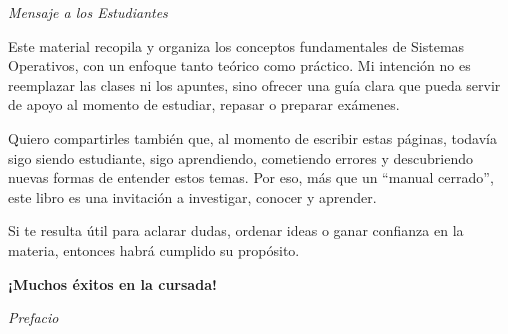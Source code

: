 \newpage
\thispagestyle{empty}
\vspace*{2cm}

\begin{center}
  {\Large\textit{Mensaje a los Estudiantes}}
\end{center}
\vspace{1.2cm}

\begin{center}
  \begin{minipage}{0.85\textwidth}
    \setlength{\parskip}{0.8em}
    Este material recopila y organiza los conceptos fundamentales de Sistemas Operativos,
    con un enfoque tanto teórico como práctico. Mi intención no es reemplazar las clases
    ni los apuntes, sino ofrecer una guía clara que pueda servir de apoyo al momento
    de estudiar, repasar o preparar exámenes.

    Quiero compartirles también que, al momento de escribir estas páginas,
    todavía sigo siendo estudiante, sigo aprendiendo, cometiendo errores y descubriendo
    nuevas formas de entender estos temas. Por eso, más que un ``manual cerrado'',
    este libro es una invitación a investigar, conocer y aprender.

    Si te resulta útil para aclarar dudas, ordenar ideas o ganar confianza en la materia,
    entonces habrá cumplido su propósito.

    \vspace{0.8cm}
    \centering\textbf{¡Muchos éxitos en la cursada!}
  \end{minipage}
\end{center}

\newpage
\thispagestyle{empty}
\vspace*{2cm}

{\Large\textit{Prefacio}}\\
\vspace{1.2cm}

